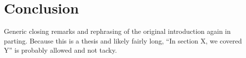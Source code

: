 \section{Conclusion}
\label{sec:conclusion}

Generic closing remarks and rephrasing of the original introduction again
in parting.
%
Because this is a thesis and likely fairly long, ``In section X, we covered Y''
is probably allowed and not tacky.


